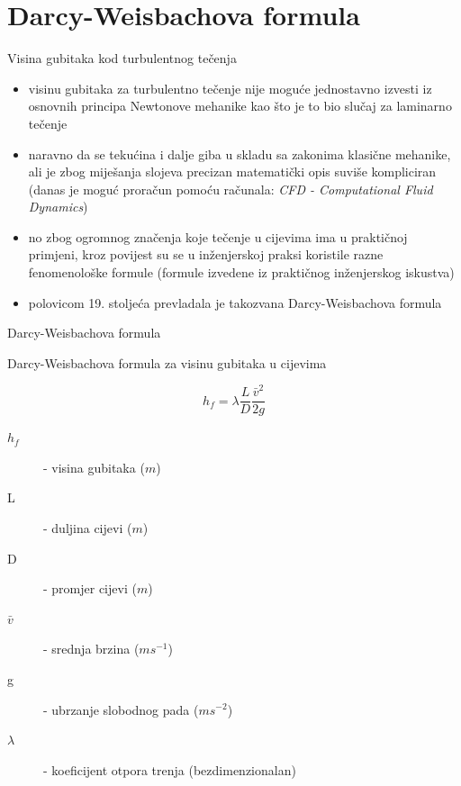 \documentclass{beamer}
\begin{document}
\section{Darcy-Weisbachova formula}
\begin{frame}{Visina gubitaka kod turbulentnog tečenja}
\begin{itemize}
\item visinu gubitaka za turbulentno tečenje nije moguće jednostavno izvesti
iz osnovnih principa Newtonove mehanike kao što je to bio slučaj za
laminarno tečenje
\item naravno da se tekućina i dalje giba u skladu sa zakonima klasične
mehanike, ali je zbog miješanja slojeva precizan matematički opis
suviše kompliciran (danas je moguć proračun pomoću računala: \emph{CFD
- Computational Fluid Dynamics})
\item no zbog ogromnog značenja koje tečenje u cijevima ima u praktičnoj
primjeni, kroz povijest su se u inženjerskoj praksi koristile razne
fenomenološke formule (formule izvedene iz praktičnog inženjerskog
iskustva)
\item polovicom 19. stoljeća prevladala je takozvana \alert{Darcy-Weisbachova formula}
\end{itemize}
\end{frame}

\begin{frame}{Darcy-Weisbachova formula}

\begin{block}{Darcy-Weisbachova formula za visinu gubitaka u cijevima}

\[
h_{f}=\lambda\frac{L}{D}\frac{\bar{v}^{2}}{2g}
\]
\end{block}
\begin{description}
\item [{$h_{f}$}] - visina gubitaka ($m$)
\item [{L}] - duljina cijevi ($m$)
\item [{D}] - promjer cijevi ($m$)
\item [{$\bar{v}$}] - srednja brzina ($ms^{-1}$)
\item [{g}] - ubrzanje slobodnog pada ($ms^{-2}$)
\item [{$\lambda$}] - \alert{koeficijent otpora trenja} (bezdimenzionalan)
\end{description}
\end{frame}
\end{document}
